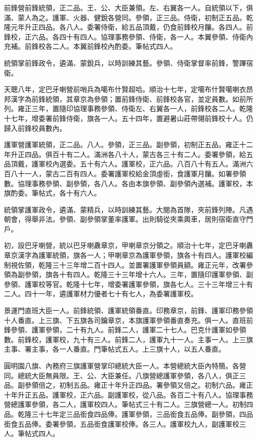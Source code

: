 \begin{pinyinscope}
前鋒營前鋒統領，正二品。王、公、大臣兼領。左、右翼各一人。自統領以下，俱滿、蒙人為之。護軍、火器、健銳各營同。參領，正三品。侍衛，初制正五品。乾隆元年升正四品。各八人。委署侍衛，給五品頂戴，仍食前鋒校月饟。各四人。前鋒校，正六品。各四十有四人。協理事務參領、侍衛，各一人。本翼參領、侍衛內充補。前鋒校各二人。本翼前鋒校內酌委。筆帖式四人。

統領掌前鋒政令，遴滿、蒙銳兵，以時訓練其藝。參領、侍衛掌督率前鋒，警蹕宿衛。

天聰八年，定巴牙喇營前哨兵為噶布什賢超哈。順治十七年，定噶布什賢噶喇衣昂邦漢字為前鋒統領，其章京為參領；置前鋒侍衛、前鋒校各官，並定員數。如前所列。雍正三年，置隨印協理事務參領、侍衛左、右翼各一人，前鋒校各二人。乾隆十七年，增委署前鋒侍衛，旗各一人。五十四年，置避暑山莊帶翎前鋒校十人。仍歸入前鋒校員數內。

護軍營護軍統領，正二品。八人。參領，正三品。副參領，初制正五品。雍正十二年升正四品。俱百十有二人。滿洲各八十人，蒙古各三十有二人。委署參領，給五品頂戴，護軍校內選委。五十有六人。護軍校，正六品。八百八十有五人。滿洲六百八十一人，蒙古二百有四人。委署護軍校給金頂虛銜，食護軍月饟。如署參領數。協理事務參領、副參領，各八人。各由本旗參領、副參領內選補。護軍校，本旗酌委。筆帖式，各十有六人。

統領掌護軍政令，遴滿、蒙精兵，以時訓練其藝。大閱為首隊，夾前鋒列陣。凡遇朝會，得舉非法。參領、副參領掌董率護軍。出則騎從夾乘輿車，居則宿衛直守門戶。

初，設巴牙喇營，統以巴牙喇纛章京，甲喇章京分領之。順治十七年，定巴牙喇纛章京漢字為護軍統領，旗各一人；甲喇章京為護軍參領，旗各十有四人。護軍校編制視佐領，乾隆三十三年增二百十四人。並置署護軍參領員額。雍正元年，改署參領為副參領，旗各十有四人。乾隆三十三年增十六人。三年，置隨印護軍參領、副參領、護軍校等官。乾隆十七年，增委署護軍參領，旗各七人。三十三年增三十有二人。四十一年，遴護軍材力優者七十有七人，為委署護軍校。

景運門直班大臣一人。前鋒統領、護軍統領番直。印務章京，前鋒、護軍印務參領十人番直。上三旗、下五旗各司鑰章京，本旗護軍參領番直奏充。俱一人。直班前鋒參領、護軍參領，二十有九人。前鋒二人，護軍二十七人。巴克什護軍如參領數。前鋒校，護軍校，九十有三人。前鋒二人，護軍九十一人。主事一人。上三旗主事、署主事，各一人番直。門筆帖式五人。上三旗十人，以五人番直。

圓明園八旗、內務府三旗護軍營掌印總統大臣一人。本營總統大臣內特簡。各營同。總統大臣無員限。王、公、大臣兼任。八旗營總護軍參領，各八人，俱正三品。副參領倍之，初制五品。雍正十年升正四品。署參領又倍之。初制六品。雍正十年升正五品。護軍校，正六品。副護軍校，從八品。各百二十有八人。協理事務營總護軍參領，各二人，護軍校四人。筆帖式三十有二人。三旗營總一人。初制四品。乾隆三十七年定三品銜食四品俸。護軍參領，三品銜食五品俸。副參領，四品銜食五品俸。委署參領，五品銜食護軍校俸。各三人。護軍校九人，副護軍校三人。筆帖式四人。


\end{pinyinscope}
